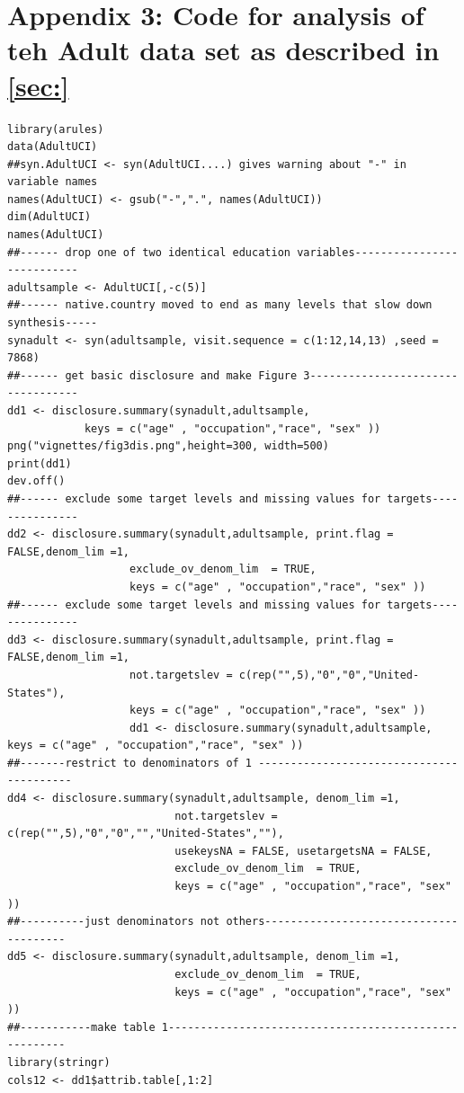 \documentclass[12pt]{article}
\renewcommand{\baselinestretch}{1.5} %
\begin{document}
\section*{Appendix 3: Code for analysis of teh Adult data set as described in \ref{sec:}}{\label{sec:app3}}
\renewcommand{\baselinestretch}{1.0}
\begin{verbatim}
library(arules)
data(AdultUCI)
##syn.AdultUCI <- syn(AdultUCI....) gives warning about "-" in variable names
names(AdultUCI) <- gsub("-",".", names(AdultUCI))
dim(AdultUCI)
names(AdultUCI)
##------ drop one of two identical education variables---------------------------
adultsample <- AdultUCI[,-c(5)]
##------ native.country moved to end as many levels that slow down synthesis-----
synadult <- syn(adultsample, visit.sequence = c(1:12,14,13) ,seed = 7868) 
##------ get basic disclosure and make Figure 3----------------------------------
dd1 <- disclosure.summary(synadult,adultsample,
            keys = c("age" , "occupation","race", "sex" ))
png("vignettes/fig3dis.png",height=300, width=500)
print(dd1)
dev.off()
##------ exclude some target levels and missing values for targets---------------
dd2 <- disclosure.summary(synadult,adultsample, print.flag = FALSE,denom_lim =1, 
                   exclude_ov_denom_lim  = TRUE, 
                   keys = c("age" , "occupation","race", "sex" ))
##------ exclude some target levels and missing values for targets---------------
dd3 <- disclosure.summary(synadult,adultsample, print.flag = FALSE,denom_lim =1, 
                   not.targetslev = c(rep("",5),"0","0","United-States"),
                   keys = c("age" , "occupation","race", "sex" ))
                   dd1 <- disclosure.summary(synadult,adultsample,  keys = c("age" , "occupation","race", "sex" ))
##-------restrict to denominators of 1 -----------------------------------------
dd4 <- disclosure.summary(synadult,adultsample, denom_lim =1, 
                          not.targetslev = c(rep("",5),"0","0","","United-States",""),
                          usekeysNA = FALSE, usetargetsNA = FALSE, 
                          exclude_ov_denom_lim  = TRUE, 
                          keys = c("age" , "occupation","race", "sex" ))
##----------just denominators not others---------------------------------------
dd5 <- disclosure.summary(synadult,adultsample, denom_lim =1, 
                          exclude_ov_denom_lim  = TRUE, 
                          keys = c("age" , "occupation","race", "sex" ))
##-----------make table 1------------------------------------------------------
library(stringr)
cols12 <- dd1$attrib.table[,1:2]

\end{verbatim}
\end{document}
